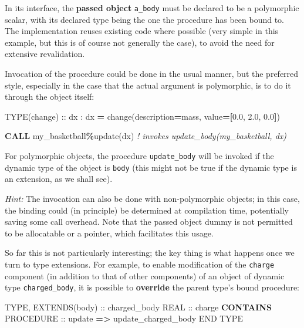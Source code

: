 \documentclass[
  paper=a4,
  ,captions=tableheading
]{scrartcl}
\newenvironment{Shaded}{\begin{snugshade}}{\end{snugshade}}
\newcommand{\CommentTok}[1]{\textcolor[rgb]{0.56,0.35,0.01}{\textit{#1}}}
\newcommand{\DataTypeTok}[1]{\textcolor[rgb]{0.13,0.29,0.53}{#1}}
\newcommand{\FloatTok}[1]{\textcolor[rgb]{0.00,0.00,0.81}{#1}}
\newcommand{\KeywordTok}[1]{\textcolor[rgb]{0.13,0.29,0.53}{\textbf{#1}}}
\newcommand{\NormalTok}[1]{#1}
\newcommand{\OperatorTok}[1]{\textcolor[rgb]{0.81,0.36,0.00}{\textbf{#1}}}
\newcommand{\StringTok}[1]{\textcolor[rgb]{0.31,0.60,0.02}{#1}}
\begin{document}
In its interface, the \textbf{passed object} \texttt{a\_body} must be
declared to be a polymorphic scalar, with its declared type being the
one the procedure has been bound to. The implementation reuses existing
code where possible (very simple in this example, but this is of course
not generally the case), to avoid the need for extensive revalidation.

Invocation of the procedure could be done in the usual manner, but the
preferred style, especially in the case that the actual argument is
polymorphic, is to do it through the object itself:

\begin{Shaded}
\begin{Highlighting}[]
\DataTypeTok{TYPE(change)} \DataTypeTok{::}\NormalTok{  dx}
\NormalTok{:}
\NormalTok{dx }\KeywordTok{=}\NormalTok{ change(description}\KeywordTok{=}\StringTok{\textquotesingle{}mass\textquotesingle{}}\NormalTok{, }\DataTypeTok{value}\KeywordTok{=[}\FloatTok{0.0}\NormalTok{, }\FloatTok{2.0}\NormalTok{, }\FloatTok{0.0}\KeywordTok{]}\NormalTok{)}

\KeywordTok{CALL}\NormalTok{ my\_basketball}\OperatorTok{\%}\NormalTok{update(dx) }\CommentTok{! invokes update\_body(my\_basketball, dx)}
\end{Highlighting}
\end{Shaded}

For polymorphic objects, the procedure \texttt{update\_body} will be
invoked if the dynamic type of the object is \texttt{body} (this might
not be true if the dynamic type is an extension, as we shall see).

\emph{Hint:} The invocation can also be done with non-polymorphic
objects; in this case, the binding could (in principle) be determined at
compilation time, potentially saving some call overhead. Note that the
passed object dummy is not permitted to be allocatable or a pointer,
which facilitates this usage.

So far this is not particularly interesting; the key thing is what
happens once we turn to type extensions. For example, to enable
modification of the \texttt{charge} component (in addition to that of
other components) of an object of dynamic type \texttt{charged\_body},
it is possible to \textbf{override} the parent type's bound procedure:

\begin{Shaded}
\begin{Highlighting}[]
\DataTypeTok{TYPE}\NormalTok{, }\DataTypeTok{EXTENDS(body)} \DataTypeTok{::}\NormalTok{ charged\_body}
   \DataTypeTok{REAL} \DataTypeTok{::}\NormalTok{ charge}
\KeywordTok{CONTAINS}
   \DataTypeTok{PROCEDURE} \DataTypeTok{::}\NormalTok{ update }\KeywordTok{=}\OperatorTok{\textgreater{}}\NormalTok{ update\_charged\_body}
\DataTypeTok{END TYPE}
\end{Highlighting}
\end{Shaded}
\end{document}
